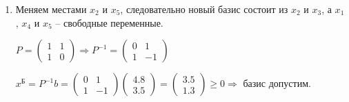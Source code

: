 \begin{enumerate}[leftmargin=*]
$\Delta_4 = c^\text{Б} P^{-1} A_4 - c_4 =
\begin{pmatrix}
	0 & 0
\end{pmatrix}
\begin{pmatrix}
	1 & 0 \\
	0 & 1 
\end{pmatrix}
\begin{pmatrix}
	0 \\
	-1
\end{pmatrix} - 0 = 0$

$\Delta = \begin{pmatrix} -2 & -3 & 0 \end{pmatrix}^T \ngeqslant 0 \Rightarrow$ базис не оптимален. 

Вводим в базис переменную $x_k$, т.ч. $k = \argmin\limits_i\Delta_i = 2 \Rightarrow x_2$.

Определим вектор $z = P^{-1} A_k = P^{-1} A_2 = 
\begin{pmatrix}
	1 & 0 \\
	0 & 1 
\end{pmatrix}
\begin{pmatrix}
	1 \\
	1
\end{pmatrix} =
\begin{pmatrix}
	1 \\
	1
\end{pmatrix}$.

Выводим из базиса переменную $x_r$, т.ч. 
$r = \argmin\limits_j\left( \left. \dfrac{x_j^\text{Б}}{z_j}\right|_{z_j>0} \right) = 5 \Rightarrow x_5$.

\item 
Меняем местами $x_2$ и $x_5$, следовательно новый базис состоит из $x_2$ и $x_3$, а $x_1$, $x_4$ и $x_5$ -- свободные переменные. 

$P = 
\begin{pmatrix}
	1 & 1 \\
	1 & 0 
\end{pmatrix} \Rightarrow
P^{-1} = 
\begin{pmatrix}
	0 & 1 \\
	1 & -1 
\end{pmatrix}$

$x^\text{Б} = P^{-1}b =
\begin{pmatrix}
	0 & 1 \\
	1 & -1
\end{pmatrix}
\begin{pmatrix}
	4.8 \\
	3.5
\end{pmatrix} =
\begin{pmatrix}
	3.5 \\
	1.3
\end{pmatrix} \geq 0
\Rightarrow$ базис допустим.


\end{enumerate}
